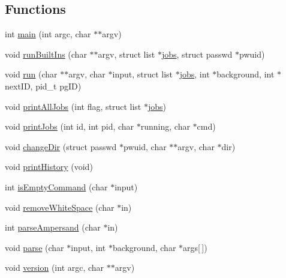 \subsection*{Functions}
\begin{DoxyCompactItemize}
\item 
int \hyperlink{mydash-src_2mydash_8c_a3c04138a5bfe5d72780bb7e82a18e627}{main} (int argc, char $\ast$$\ast$argv)
\item 
void \hyperlink{mydash-src_2mydash_8c_a0c88efa38e3ca069ad715ac5fbb7baed}{run\-Built\-Ins} (char $\ast$$\ast$argv, struct list $\ast$\hyperlink{p3submit_2mydash_8c_a7fbf7d423751525b8391d5e19d2f77d4}{jobs}, struct passwd $\ast$pwuid)
\item 
void \hyperlink{mydash-src_2mydash_8c_a80dc57d5db2a940022eeae60452339ee}{run} (char $\ast$$\ast$argv, char $\ast$input, struct list $\ast$\hyperlink{p3submit_2mydash_8c_a7fbf7d423751525b8391d5e19d2f77d4}{jobs}, int $\ast$background, int $\ast$next\-I\-D, pid\-\_\-t pg\-I\-D)
\item 
void \hyperlink{mydash-src_2mydash_8c_ae23098c009c74791925468628dc98022}{print\-All\-Jobs} (int flag, struct list $\ast$\hyperlink{p3submit_2mydash_8c_a7fbf7d423751525b8391d5e19d2f77d4}{jobs})
\item 
void \hyperlink{mydash-src_2mydash_8c_ad435e875f9b06471147f018f4168bb11}{print\-Jobs} (int id, int pid, char $\ast$running, char $\ast$cmd)
\item 
void \hyperlink{mydash-src_2mydash_8c_a0d5c1d0102995d5cd6d2a494dc85f069}{change\-Dir} (struct passwd $\ast$pwuid, char $\ast$$\ast$argv, char $\ast$dir)
\item 
void \hyperlink{mydash-src_2mydash_8c_a69f1a01af1a62604f48ea00b42cdd2f2}{print\-History} (void)
\item 
int \hyperlink{mydash-src_2mydash_8c_a0e33dae31e456526bb0649ec614424ba}{is\-Empty\-Command} (char $\ast$input)
\item 
void \hyperlink{mydash-src_2mydash_8c_afea8b0662566f524f589c722e22a1921}{remove\-White\-Space} (char $\ast$in)
\item 
int \hyperlink{mydash-src_2mydash_8c_ace4d96293e7eb7775bbdf09ac251b327}{parse\-Ampersand} (char $\ast$in)
\item 
void \hyperlink{mydash-src_2mydash_8c_aa2d345dda450a6fe9178fe7be1925dd6}{parse} (char $\ast$input, int $\ast$background, char $\ast$args\mbox{[}$\,$\mbox{]})
\item 
void \hyperlink{mydash-src_2mydash_8c_a2318f5410e5b886031286df143719636}{version} (int argc, char $\ast$$\ast$argv)
$$
\end{DoxyCompactItemize}
